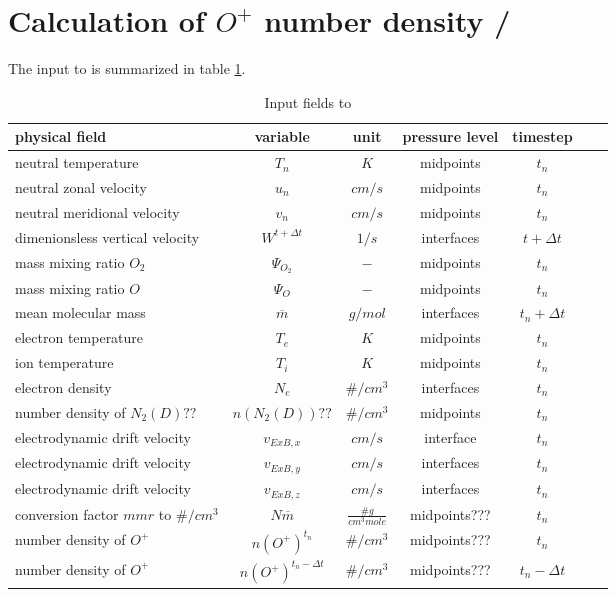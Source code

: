%
\section{Calculation of $O^+$ number density / \\
  }\label{cap:oplus}
%
The input to  is summarized in table
\ref{tab:input_oplus}.
%
\begin{table}[tb]
\begin{tabular}{|p{3.5cm} ||c|c|c|c|c|c|} \hline
physical field               & variable        & unit&pressure
level& timestep
\\ \hline \hline
%
neutral temperature &       $T_n$              & $K$   &  midpoints & $t_n$\\
neutral zonal velocity&     $u_n$     & $cm/s$   &  midpoints & $t_n$\\
neutral meridional velocity & $v_n$   & $cm/s$   &  midpoints & $t_n$\\
dimenionsless vertical velocity& $W^{t+\Delta t}$& $1/s$   & interfaces& $t+\Delta t$ \\
mass mixing ratio $O_2$&       {$\Psi_{O_2}$}     & $-$   & midpoints  & $t_n$\\
mass mixing ratio $O$&       {$\Psi_{O}$}     & $-$   &  midpoints & $t_n$\\
mean molecular mass&       {$\overline{m}$}     & $g/mol$   & interfaces  &$t_n + \Delta t$ \\
electron temperature &       $T_e$              & $K$   &  midpoints & $t_n$\\
ion temperature &       $T_i$              & $K$   &  midpoints & $t_n$\\
electron density &       $N_e$              & $\#/cm^3$   &  interfaces & $t_n$\\
number density of $N_2(D)??$ &       $n(N_2(D))??$              & $\#/cm^3$   &  midpoints & $t_n$\\
electrodynamic drift velocity &       $v_{ExB,x}$              & $cm/s$   &  interface & $t_n$\\
electrodynamic drift velocity &       $v_{ExB,y}$              & $cm/s$   &  interfaces & $t_n$\\
electrodynamic drift velocity &       $v_{ExB,z}$              & $cm/s$   &  interfaces & $t_n$\\
conversion factor $mmr$ to $\#/cm^3$ &       $N\overline{m}$              & $\frac{\# g}{cm^3 mole}$   &  midpoints??? & $t_n$\\
number density of $O^+$ &       $n(O^+)^{t_n}$              & $\#/cm^3$   &  midpoints??? & $t_n$\\
number density of $O^+$ &       $n(O^+)^{t_n- \Delta t}$ & $\#/cm^3$
&  midpoints??? & $t_n- \Delta t$
  \\ \hline
\end{tabular}
\caption{Input fields to }
\label{tab:input_oplus}
\end{table}
